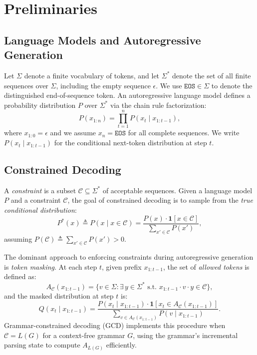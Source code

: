 \documentclass[twoside,11pt]{article}
\newcommand{\Vocab}{\Sigma}
\newcommand{\Constraint}{\mathcal{C}}
\newcommand{\indicator}{\mathbf{1}}
\begin{document}
\section{Preliminaries}
\label{sec:preliminaries}

\subsection{Language Models and Autoregressive Generation}
\label{sec:prelim-lm}

Let $\Vocab$ denote a finite vocabulary of tokens, and let $\Vocab^*$ denote
the set of all finite sequences over $\Vocab$, including the empty sequence
$\epsilon$. We use $\texttt{EOS} \in \Vocab$ to denote the distinguished
end-of-sequence token. An autoregressive language model defines a probability
distribution $P$ over $\Vocab^*$ via the chain rule factorization:
\begin{equation}
\label{eq:autoregressive}
P(x_{1:n}) = \prod_{t=1}^{n} P(x_t \mid x_{1:t-1}),
\end{equation}
where $x_{1:0} = \epsilon$ and we assume $x_n = \texttt{EOS}$ for all
complete sequences. We write $P(x_t \mid x_{1:t-1})$ for the conditional
next-token distribution at step $t$.

\subsection{Constrained Decoding}
\label{sec:prelim-cd}

A \emph{constraint} is a subset $\Constraint \subseteq \Vocab^*$ of
acceptable sequences. Given a language model $P$ and a constraint
$\Constraint$, the goal of constrained decoding is to sample from the
\emph{true conditional distribution}:
\begin{equation}
\label{eq:true-conditional}
P^*(x) \triangleq P(x \mid x \in \Constraint) = \frac{P(x) \cdot
\indicator[x \in \Constraint]}{\sum_{x' \in \Constraint} P(x')},
\end{equation}
assuming $P(\Constraint) \triangleq \sum_{x' \in \Constraint} P(x') > 0$.

The dominant approach to enforcing constraints during autoregressive
generation is \emph{token masking}. At each step $t$, given prefix
$x_{1:t-1}$, the set of \emph{allowed tokens} is defined as:
\begin{equation}
\label{eq:masking-operator}
A_\Constraint(x_{1:t-1}) = \{v \in \Vocab : \exists\, y \in \Vocab^*
\text{ s.t. } x_{1:t-1} \cdot v \cdot y \in \Constraint\},
\end{equation}
and the masked distribution at step $t$ is:
\begin{equation}
\label{eq:masked-dist}
Q(x_t \mid x_{1:t-1}) = \frac{P(x_t \mid x_{1:t-1}) \cdot
\indicator[x_t \in A_\Constraint(x_{1:t-1})]}{\sum_{v \in
A_\Constraint(x_{1:t-1})} P(v \mid x_{1:t-1})}.
\end{equation}
Grammar-constrained decoding (GCD) implements this procedure when
$\Constraint = L(G)$ for a context-free grammar $G$, using the grammar's
incremental parsing state to compute $A_{L(G)}$ efficiently.
\end{document}
